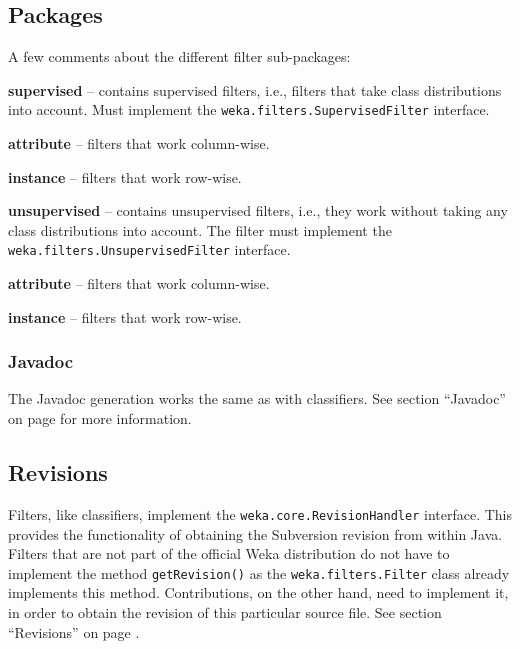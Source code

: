 \subsection{Packages}
A few comments about the different filter sub-packages:
\begin{tight_itemize}
  \item \textbf{supervised} -- contains supervised filters, i.e., filters that
take class distributions into account. Must implement the
\texttt{weka.filters.SupervisedFilter} interface.
  \begin{tight_itemize}
	\item \textbf{attribute} -- filters that work column-wise.
	\item \textbf{instance} -- filters that work row-wise.
  \end{tight_itemize}
  \item \textbf{unsupervised} -- contains unsupervised filters, i.e., they work
without taking any class distributions into account. The filter must implement
the \texttt{weka.filters.UnsupervisedFilter} interface.
  \begin{tight_itemize}
	\item \textbf{attribute} -- filters that work column-wise.
	\item \textbf{instance} -- filters that work row-wise.
  \end{tight_itemize}
\end{tight_itemize}

\subsubsection*{Javadoc}
The Javadoc generation works the same as with classifiers. See section
``Javadoc'' on page \pageref{classifier_javadoc} for more information.

\subsection{Revisions}
Filters, like classifiers, implement the \texttt{weka.core.RevisionHandler}
interface. This provides the functionality of obtaining the Subversion revision
from within Java. Filters that are not part of the official Weka distribution
do not have to implement the method \texttt{getRevision()} as the
\texttt{weka.filters.Filter} class already implements this method.
Contributions, on the other hand, need to implement it, in order to
obtain the revision of this particular source file. See section ``Revisions''
on page \pageref{classifier_revisions}.

